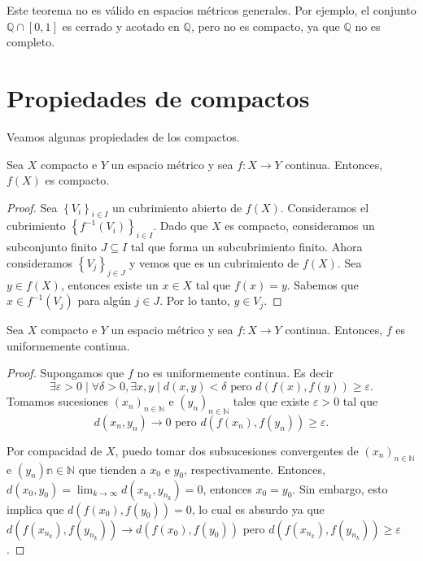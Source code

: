 \begin{remark}
	Este teorema no es válido en espacios métricos generales. Por ejemplo, el conjunto $\mathbb{Q} \cap [0,1]$ es cerrado y acotado en $\mathbb{Q}$, pero no es compacto, ya que $\mathbb{Q}$ no es completo.
\end{remark}

\section{Propiedades de compactos}

Veamos algunas propiedades de los compactos.

\begin{proposition}
	Sea $X$ compacto e $Y$ un espacio métrico y sea $f : X \to Y$ continua. Entonces, $f(X)$ es compacto.
\end{proposition}

\begin{proof}
	Sea $\left\{ V_i \right\}_{i \in I}$ un cubrimiento abierto de $f(X)$. Consideramos el cubrimiento $\left\{ f^{-1}(V_i) \right\}_{i \in I}$. Dado que $X$ es compacto, consideramos un subconjunto finito $J \subseteq I $ tal que forma un subcubrimiento finito. Ahora consideramos $\left\{ V_j \right\}_{j \in J}$ y vemos que es un cubrimiento de $f(X)$. Sea $y \in f(X)$, entonces existe un $x \in X$ tal que $f(x) = y$. Sabemos que $x \in f^{-1}(V_j)$ para algún $j \in J$. Por lo tanto, $y \in V_j$.
\end{proof}

\begin{proposition}
	Sea $X$ compacto e $Y$ un espacio métrico y sea $f : X \to Y$ continua. Entonces, $f$ es uniformemente continua.
\end{proposition}

\begin{proof}
	Supongamos que $f$ no es uniformemente continua. Es decir
	\begin{equation*}
		\exists \varepsilon > 0 \mid \forall \delta > 0, \exists x, y \mid d(x, y) < \delta \text{ pero } d(f(x), f(y)) \geq \varepsilon.
	\end{equation*}
	Tomamos sucesiones $(x_n)_{n \in \mathbb{N}}$ e $(y_n)_{n \in \mathbb{\mathbb{N}}}$ tales que existe $\varepsilon > 0$ tal que
	\begin{equation*}
		d(x_n, y_n) \to 0 \text{ pero } d(f(x_n), f(y_n)) \geq \varepsilon.
	\end{equation*}

	Por compacidad de $X$, puedo tomar dos subsucesiones convergentes de $(x_n)_{n \in \mathbb{N}}$ e $(y_n)\mathbb{n \in \mathbb{N}}$ que tienden a $x_0$ e $y_0$, respectivamente. Entonces, $d(x_0, y_0) = \lim_{k \to \infty} d(x_{n_k}, y_{n_k}) = 0$, entonces $x_0 = y_0$. Sin embargo, esto implica que $d(f(x_0), f(y_0)) = 0$, lo cual es absurdo ya que $d(f(x_{n_k}), f(y_{n_k})) \to d(f(x_0), f(y_0))$ pero $d(f(x_{n_k}), f(y_{n_k})) \geq \varepsilon$.
\end{proof}

